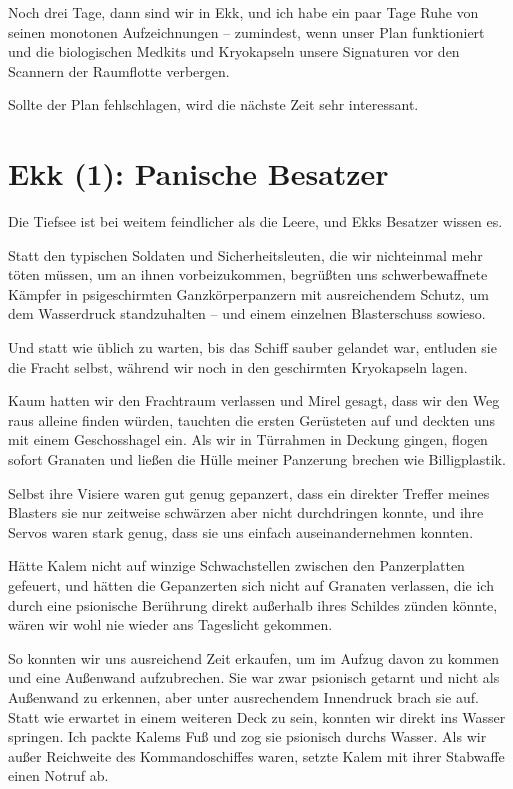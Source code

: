 \documentclass[11pt]{scrartcl}
\begin{document}
Noch drei Tage, dann sind wir in Ekk, und ich habe ein paar Tage Ruhe
von seinen monotonen Aufzeichnungen -- zumindest, wenn unser Plan
funktioniert und die biologischen Medkits und Kryokapseln unsere
Signaturen vor den Scannern der Raumflotte verbergen.

Sollte der Plan fehlschlagen, wird die nächste Zeit sehr interessant.

\section{Ekk (1): Panische Besatzer}

Die Tiefsee ist bei weitem feindlicher als die Leere, und Ekks Besatzer
wissen es.

Statt den typischen Soldaten und Sicherheitsleuten, die wir nichteinmal
mehr töten müssen, um an ihnen vorbeizukommen, begrüßten uns
schwerbewaffnete Kämpfer in psigeschirmten Ganzkörperpanzern mit
ausreichendem Schutz, um dem Wasserdruck standzuhalten -- und einem
einzelnen Blasterschuss sowieso.

Und statt wie üblich zu warten, bis das Schiff sauber gelandet war,
entluden sie die Fracht selbst, während wir noch in den geschirmten
Kryokapseln lagen.

Kaum hatten wir den Frachtraum verlassen und Mirel gesagt, dass wir den
Weg raus alleine finden würden, tauchten die ersten Gerüsteten auf und
deckten uns mit einem Geschosshagel ein. Als wir in Türrahmen in Deckung
gingen, flogen sofort Granaten und ließen die Hülle meiner Panzerung
brechen wie Billigplastik.

Selbst ihre Visiere waren gut genug gepanzert, dass ein direkter Treffer
meines Blasters sie nur zeitweise schwärzen aber nicht durchdringen
konnte, und ihre Servos waren stark genug, dass sie uns einfach
auseinandernehmen konnten.

Hätte Kalem nicht auf winzige Schwachstellen zwischen den Panzerplatten
gefeuert, und hätten die Gepanzerten sich nicht auf Granaten verlassen,
die ich durch eine psionische Berührung direkt außerhalb ihres Schildes
zünden könnte, wären wir wohl nie wieder ans Tageslicht gekommen.

So konnten wir uns ausreichend Zeit erkaufen, um im Aufzug davon zu
kommen und eine Außenwand aufzubrechen. Sie war zwar psionisch getarnt
und nicht als Außenwand zu erkennen, aber unter ausrechendem Innendruck
brach sie auf. Statt wie erwartet in einem weiteren Deck zu sein,
konnten wir direkt ins Wasser springen. Ich packte Kalems Fuß und zog
sie psionisch durchs Wasser. Als wir außer Reichweite des
Kommandoschiffes waren, setzte Kalem mit ihrer Stabwaffe einen Notruf
ab.
\end{document}
